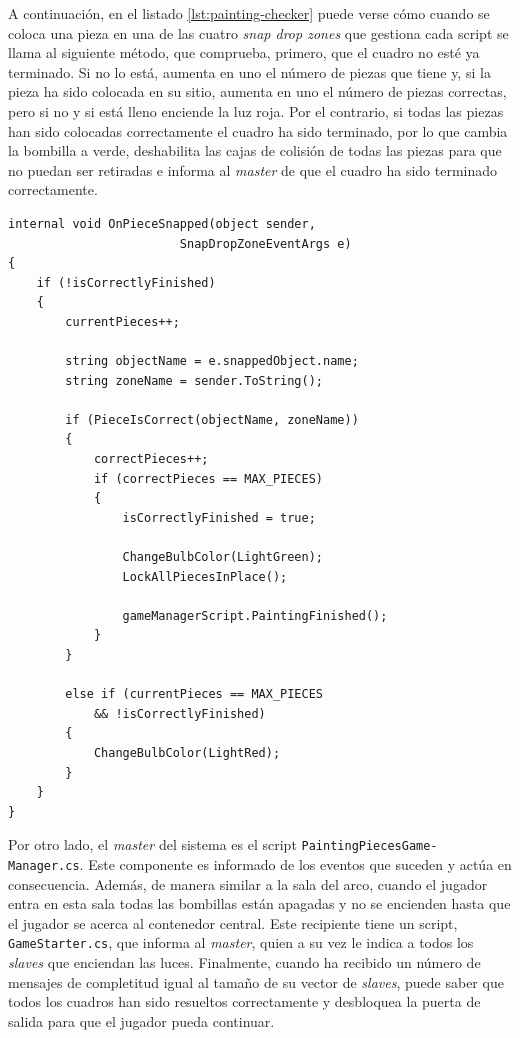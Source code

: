 A continuación, en el listado \ref{lst:painting-checker} puede verse cómo cuando se coloca una pieza en una de las cuatro \textit{snap drop zones} que gestiona cada script se llama al siguiente método, que comprueba, primero, que el cuadro no esté ya terminado. Si no lo está, aumenta en uno el número de piezas que tiene y, si la pieza ha sido colocada en su sitio, aumenta en uno el número de piezas correctas, pero si no y si está lleno enciende la luz roja. Por el contrario, si todas las piezas han sido colocadas correctamente el cuadro ha sido terminado, por lo que cambia la bombilla a verde, deshabilita las cajas de colisión de todas las piezas para que no puedan ser retiradas e informa al \textit{master} de que el cuadro ha sido terminado correctamente.

\begin{lstlisting}[caption=Fragmento del script detectar piezas de cuadros, label=lst:painting-checker]
internal void OnPieceSnapped(object sender, 
                        SnapDropZoneEventArgs e)
{
    if (!isCorrectlyFinished)
    {
        currentPieces++;
    
        string objectName = e.snappedObject.name;
        string zoneName = sender.ToString();
    
        if (PieceIsCorrect(objectName, zoneName))
        {
            correctPieces++;
            if (correctPieces == MAX_PIECES)
            {
                isCorrectlyFinished = true;
    
                ChangeBulbColor(LightGreen);
                LockAllPiecesInPlace();
    
                gameManagerScript.PaintingFinished();
            }
        }
    
        else if (currentPieces == MAX_PIECES 
            && !isCorrectlyFinished)
        {
            ChangeBulbColor(LightRed);
        }
    }
}
\end{lstlisting}

Por otro lado, el \textit{master} del sistema es el script \texttt{PaintingPiecesGame-} \texttt{Manager.cs}. Este componente es informado de los eventos que suceden y actúa en consecuencia. Además, de manera similar a la sala del arco, cuando el jugador entra en esta sala todas las bombillas están apagadas y no se encienden hasta que el jugador se acerca al contenedor central. Este recipiente tiene un script, \texttt{GameStarter.cs}, que informa al \textit{master}, quien a su vez le indica a todos los \textit{slaves} que enciendan las luces. Finalmente, cuando ha recibido un número de mensajes de completitud igual al tamaño de su vector de \textit{slaves}, puede saber que todos los cuadros han sido resueltos correctamente y desbloquea la puerta de salida para que el jugador pueda continuar.


